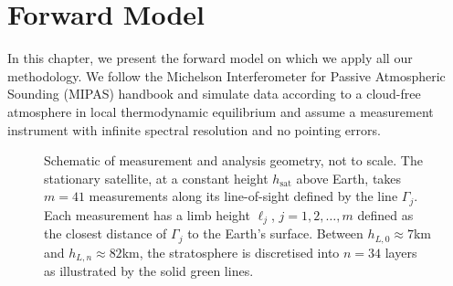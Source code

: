 \chapter{Forward Model}
\label{ch:formodel}

In this chapter, we present the forward model on which we apply all our methodology. We follow the Michelson Interferometer for Passive Atmospheric Sounding (MIPAS) handbook \cite{mipas2000handbook} and simulate data according to a cloud-free atmosphere in local thermodynamic equilibrium and assume a measurement instrument with infinite spectral resolution and no pointing errors.
\begin{figure}[ht!]
	\centering
	
	\caption[Schematic of measurement and analysis geometry.]{Schematic of measurement and analysis geometry, not to scale.
		The stationary satellite, at a constant height $h_\text{sat}$ above Earth, takes $m = 41$ measurements along its line-of-sight defined by the line $\Gamma_j$.
		Each measurement has a limb height $\ell_j$, $j=1,2,\dots,m$ defined as the closest distance of $\Gamma_j$ to the Earth's surface.
		Between $h_{L,0} \approx 7$km and $h_{L,n} \approx 82$km, the stratosphere is discretised into $n =34$ layers as illustrated by the solid green lines.}
	\label{fig:LIMB}
\end{figure}


